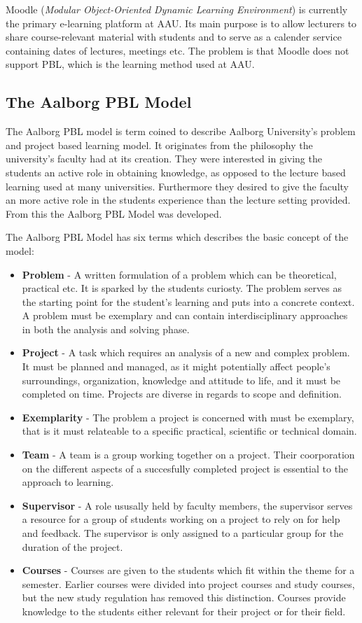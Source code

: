 Moodle (\emph{Modular Object-Oriented Dynamic Learning Environment}) \citep{moodle} is currently the primary e-learning platform at AAU. Its main purpose is to allow lecturers to share course-relevant material with students and to serve as a calender service containing dates of lectures, meetings etc. The problem is that Moodle does not support PBL, which is the learning method used at AAU.

\subsection{The Aalborg PBL Model}
The Aalborg PBL model is term coined to describe Aalborg University's problem and project based learning model. It originates from the philosophy the university's faculty had at its creation. They were interested in giving the students an active role in obtaining knowledge, as opposed to the lecture based learning used at many universities. Furthermore they desired to give the faculty an more active role in the students experience than the lecture setting provided. From this the Aalborg PBL Model was developed.

The Aalborg PBL Model has six terms which describes the basic concept of the model:

\begin{itemize}
	\item \textbf{Problem} - A written formulation of a problem which can be theoretical, practical etc. It is sparked by the students curiosty. The problem serves as the starting point for the student's learning and puts into a concrete context. A problem must be exemplary and can contain interdisciplinary approaches	in both the analysis and solving phase.
	\item \textbf{Project} - A task which requires an analysis of a new and complex problem. It must be planned and managed, as it might potentially affect people's surroundings, organization, knowledge and attitude to life, and it must be completed on time. Projects are diverse in regards to scope and definition.
	\item \textbf{Exemplarity} - The problem a project is concerned with must be exemplary, that is it must relateable to a specific practical, scientific or technical domain.
	\item \textbf{Team} - A team is a group working together on a project. Their coorporation on the different aspects of a succesfully completed project is essential to the approach to learning.
	\item \textbf{Supervisor} - A role ususally held by faculty members, the supervisor serves a resource for a group of students working on a project to rely on for help and feedback. The supervisor is only assigned to a particular group for the duration of the project. 
	\item \textbf{Courses} - Courses are given to the students which fit within the theme for a semester. Earlier courses were divided into project courses and study courses, but the new study regulation has removed this distinction. Courses provide knowledge to the students either relevant for their project or for their field.
\end{itemize}

